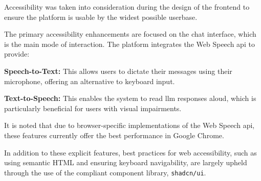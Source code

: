 Accessibility was taken into consideration during the design of the frontend to ensure the platform is usable by the widest possible userbase.

The primary accessibility enhancements are focused on the chat interface, which is the main mode of interaction. The platform integrates the Web Speech \acs{api} to provide:
\begin{compactitem}[\textbullet]
    \item \textbf{Speech-to-Text:} This allows users to dictate their messages using their microphone, offering an alternative to keyboard input.
    \item \textbf{Text-to-Speech:} This enables the system to read \ac{llm} responses aloud, which is particularly beneficial for users with visual impairments.
\end{compactitem}
It is noted that due to browser-specific implementations of the Web Speech \acs{api}, these features currently offer the best performance in Google Chrome.

In addition to these explicit features, best practices for web accessibility, such as using semantic HTML and ensuring keyboard navigability, are largely upheld through the use of the compliant component library, \texttt{shadcn/ui}.